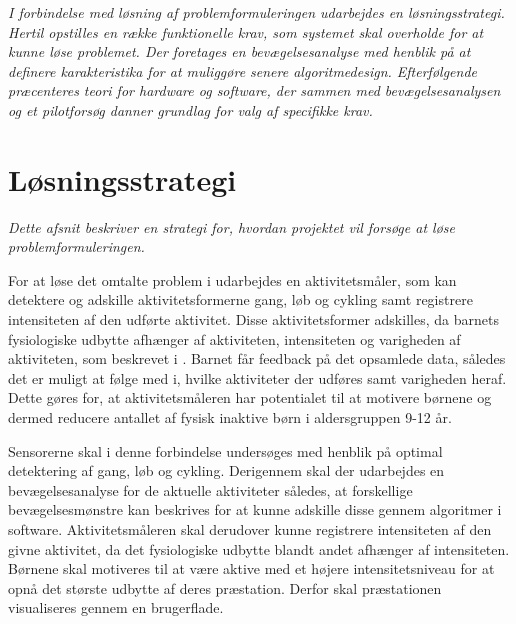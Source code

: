 \textit{I forbindelse med løsning af problemformuleringen udarbejdes en løsningsstrategi. Hertil opstilles en række funktionelle krav, som systemet skal overholde for at kunne løse problemet. Der foretages en bevægelsesanalyse med henblik på at definere karakteristika for at muliggøre senere algoritmedesign. Efterfølgende præcenteres teori for hardware og software, der sammen med bevægelsesanalysen og et pilotforsøg danner grundlag for valg af specifikke krav.}

\section{Løsningsstrategi}
\textit{Dette afsnit beskriver en strategi for, hvordan projektet vil forsøge at løse problemformuleringen.}

For at løse det omtalte problem i  udarbejdes en aktivitetsmåler, som kan detektere og adskille aktivitetsformerne gang, løb og cykling samt registrere intensiteten af den udførte aktivitet. Disse aktivitetsformer adskilles, da barnets fysiologiske udbytte afhænger af aktiviteten, intensiteten og varigheden af aktiviteten, som beskrevet i . Barnet får feedback på det opsamlede data, således det er muligt at følge med i, hvilke aktiviteter der udføres samt varigheden heraf. Dette gøres for, at aktivitetsmåleren har potentialet til at motivere børnene og dermed reducere antallet af fysisk inaktive børn i aldersgruppen 9-12 år.

Sensorerne skal i denne forbindelse undersøges med henblik på optimal detektering af gang, løb og cykling. Derigennem skal der udarbejdes en bevægelsesanalyse for de aktuelle aktiviteter således, at forskellige bevægelsesmønstre kan beskrives for at kunne adskille disse gennem algoritmer i software. Aktivitetsmåleren skal derudover kunne registrere intensiteten af den givne aktivitet, da det fysiologiske udbytte blandt andet afhænger af intensiteten. Børnene skal motiveres til at være aktive med et højere intensitetsniveau for at opnå det største udbytte af deres præstation. Derfor skal præstationen visualiseres gennem en brugerflade.%



